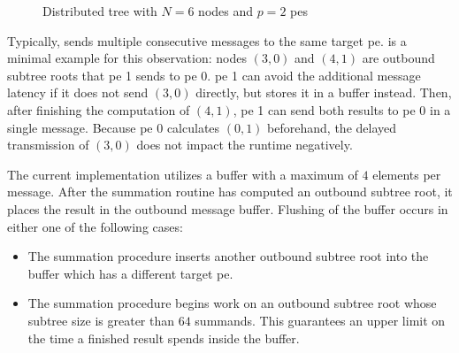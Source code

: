 \begin{figure}[H]
\centering
{}
\caption{Distributed tree with $N=6$ nodes and $p=2$ \glspl{pe}}
\label{fig:messageBufferingTree}
\end{figure}

Typically,  sends multiple consecutive messages to the same target \gls{pe}.
 is a minimal example for this observation: nodes $(3,0)$ and $(4,1)$ are outbound subtree roots that \gls{pe} 1 sends to \gls{pe} 0.
\gls{pe} 1 can avoid the additional message latency if it does not send $(3,0)$ directly, but stores it in a buffer instead.
Then, after finishing the computation of $(4,1)$, \gls{pe} 1 can send both results to \gls{pe} 0 in a single message.
Because \gls{pe} 0 calculates $(0,1)$ beforehand, the delayed transmission of $(3,0)$ does not impact the runtime negatively.

The current implementation utilizes a buffer with a maximum of $4$ elements per message.
After the summation routine has computed an outbound subtree root, it places the result in the outbound message buffer.
Flushing of the buffer occurs in either one of the following cases: \begin{itemize} 
\item The summation procedure inserts another outbound subtree root into the buffer which has a different target \gls{pe}.
\item The summation procedure begins work on an outbound subtree root whose subtree size is greater than $64$ summands. This guarantees an upper limit on the time a finished result spends inside the buffer.
\end{itemize}

